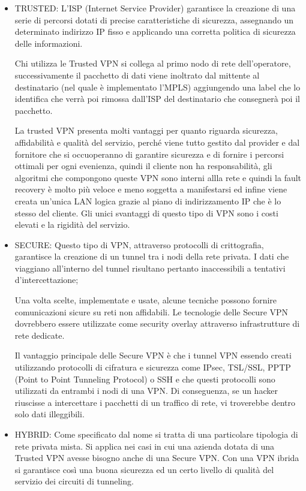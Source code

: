 \begin{itemize}
    \item TRUSTED: L’ISP (Internet Service Provider) garantisce la creazione di una serie di percorsi dotati di precise caratteristiche di sicurezza, assegnando un determinato indirizzo IP fisso e applicando una corretta politica di sicurezza delle informazioni.
    
    Chi utilizza le Trusted VPN si collega al primo nodo di rete dell’operatore, successivamente il pacchetto di dati viene inoltrato dal mittente al destinatario (nel quale è implementato l’MPLS) aggiungendo una label che lo identifica che verrà poi rimossa dall’ISP del destinatario che consegnerà poi il pacchetto.

    La trusted VPN presenta molti vantaggi per quanto riguarda sicurezza, affidabilità e qualità del servizio, perché viene tutto gestito dal provider e dal fornitore che si occuoperanno di garantire sicurezza e di fornire i percorsi ottimali per ogni evenienza, quindi il cliente non ha responsabilità, gli algoritmi che compongono queste VPN sono interni allla rete e quindi la fault recovery è molto più veloce e meno soggetta a manifestarsi ed infine viene creata un’unica LAN logica grazie al piano di indirizzamento IP che è lo stesso del cliente. Gli unici svantaggi di questo tipo di VPN sono i costi elevati e la rigidità del servizio.

    \item SECURE: Questo tipo di VPN, attraverso protocolli di crittografia, garantisce la creazione di un tunnel tra i nodi della rete privata. I dati che viaggiano all’interno del tunnel risultano pertanto inaccessibili a tentativi d’intercettazione;
    
    Una volta scelte, implementate e usate, alcune tecniche possono fornire comunicazioni sicure su reti non affidabili. Le tecnologie delle Secure VPN dovrebbero essere utilizzate come security overlay attraverso infrastrutture di rete dedicate.

    Il vantaggio principale delle Secure VPN è che i tunnel VPN essendo creati utilizzando protocolli di cifratura e sicurezza come IPsec, TSL/SSL, PPTP (Point to Point Tunneling Protocol) o SSH e che questi protocolli sono utilizzati da entrambi i nodi di una VPN. Di conseguenza, se un hacker riuscisse a intercettare i pacchetti di un traffico di rete, vi troverebbe dentro solo dati illeggibili.

    \item HYBRID: Come specificato dal nome si tratta di una particolare tipologia di rete privata mista. Si applica nei casi in cui una azienda dotata di una Trusted VPN avesse bisogno anche di una Secure VPN. Con una VPN ibrida si garantisce così una buona sicurezza ed un certo livello di qualità del servizio dei circuiti di tunneling.
    

\end{itemize}
